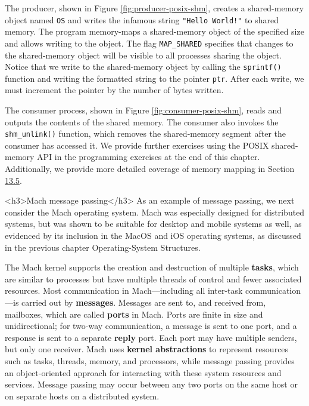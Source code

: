 The producer, shown in Figure \ref{fig:producer-posix-shm}, creates a shared-memory object named \texttt{OS} and writes the infamous string \texttt{"Hello World!"} to shared memory. The program memory-maps a shared-memory object of the specified size and allows writing to the object. The flag \texttt{MAP\_SHARED} specifies that changes to the shared-memory object will be visible to all processes sharing the object. Notice that we write to the shared-memory object by calling the \texttt{sprintf()} function and writing the formatted string to the pointer \texttt{ptr}. After each write, we must increment the pointer by the number of bytes written.

The consumer process, shown in Figure \ref{fig:consumer-posix-shm}, reads and outputs the contents of the shared memory. The consumer also invokes the \texttt{shm\_unlink()} function, which removes the shared-memory segment after the consumer has accessed it. We provide further exercises using the POSIX shared-memory API in the programming exercises at the end of this chapter. Additionally, we provide more detailed coverage of memory mapping in Section \hyperref[sec:13.5]{13.5}.

<h3>Mach message passing</h3>
As an example of message passing, we next consider the Mach operating system. Mach was especially designed for distributed systems, but was shown to be suitable for desktop and mobile systems as well, as evidenced by its inclusion in the MacOS and iOS operating systems, as discussed in the previous chapter Operating-System Structures.

The Mach kernel supports the creation and destruction of multiple \textbf{tasks}, which are similar to processes but have multiple threads of control and fewer associated resources. Most communication in Mach---including all inter-task communication---is carried out by \textbf{messages}. Messages are sent to, and received from, mailboxes, which are called \textbf{ports} in Mach. Ports are finite in size and unidirectional; for two-way communication, a message is sent to one port, and a response is sent to a separate \textbf{reply} port. Each port may have multiple senders, but only one receiver. Mach uses \textbf{kernel abstractions} to represent resources such as tasks, threads, memory, and processors, while message passing provides an object-oriented approach for interacting with these system resources and services. Message passing may occur between any two ports on the same host or on separate hosts on a distributed system.


